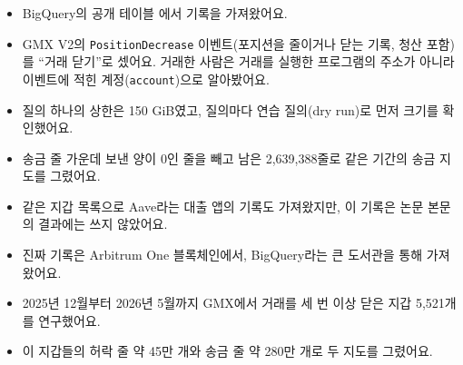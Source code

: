 \begin{deeper}[진짜 이름과 숫자]
\begin{itemize}
\item BigQuery의 공개 테이블 에서 기록을 가져왔어요.
\item GMX V2의 \texttt{PositionDecrease} 이벤트(포지션을 줄이거나 닫는 기록, 청산 포함)를 “거래 닫기”로 셌어요.
      거래한 사람은 거래를 실행한 프로그램의 주소가 아니라 이벤트에 적힌 계정(\texttt{account})으로 알아봤어요.
\item 질의 하나의 상한은 150 GiB였고, 질의마다 연습 질의(dry run)로 먼저 크기를 확인했어요.
\item 송금 줄 가운데 보낸 양이 0인 줄을 빼고 남은 2,639,388줄로 같은 기간의 송금 지도를 그렸어요.
\item 같은 지갑 목록으로 Aave라는 대출 앱의 기록도 가져왔지만, 이 기록은 논문 본문의 결과에는 쓰지 않았어요.
\end{itemize}
\end{deeper}

\begin{learned}
\begin{itemize}
\item 진짜 기록은 Arbitrum One 블록체인에서, BigQuery라는 큰 도서관을 통해 가져왔어요.
\item 2025년 12월부터 2026년 5월까지 GMX에서 거래를 세 번 이상 닫은 지갑 5,521개를 연구했어요.
\item 이 지갑들의 허락 줄 약 45만 개와 송금 줄 약 280만 개로 두 지도를 그렸어요.
\end{itemize}
\end{learned}
